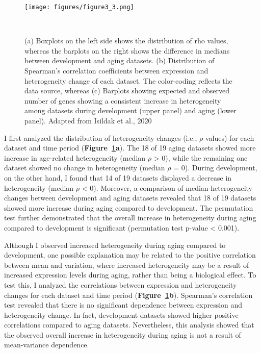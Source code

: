 \begin{figure}[h]
    \centering
    \texttt{[image: figures/figure3\_3.png]}
    \caption{(a) Boxplots on the left side shows the distribution of rho values, 
    whereas the barplots on the right shows the difference in medians between development and aging datasets.
    (b) Distribution of Spearman's correlation coefficients between expression and heterogeneity change of each dataset. 
    The color-coding reflects the data source, whereas 
    (c) Barplots showing expected and observed number of genes showing a consistent increase in heterogeneity among datasets during development (upper panel) and aging (lower panel).
    Adapted from Isildak et al., 2020
    }~\label{fig:fig3.3}
\end{figure}

I first analyzed the distribution of heterogeneity changes (i.e., $\rho$ values) for each dataset and time period (\textbf{Figure~\ref{fig:fig3.3}a}).
The 18 of 19 aging datasets showed more increase in age-related heterogeneity (median $\rho$ > 0), 
while the remaining one dataset showed no change in heterogeneity (median $\rho$ = 0). 
During development, on the other hand, I found that 14 of 19 datasets displayed a decrease in heterogeneity  (median $\rho$ < 0).
Moreover, a comparison of median heterogeneity changes between development and aging datasets revealed that 
18 of 19 datasets showed more increase during aging compared to development. 
The permutation test further demonstrated that the overall increase in heterogeneity during aging compared to development is significant (permutation test p-value < 0.001).

Although I observed increased heterogeneity during aging compared to development, 
one possible explanation may be related to the positive correlation between mean and variation, 
where increased heterogeneity may be a result of increased expression levels during aging, rather than being a biological effect.
To test this, I analyzed the correlations between expression and heterogeneity changes for each dataset and time period (\textbf{Figure~\ref{fig:fig3.3}b}).
Spearman's correlation test revealed that there is no significant dependence between expression and heterogeneity change.
In fact, development datasets showed higher positive correlations compared to aging datasets. 
Nevertheless, this analysis showed that the observed overall increase in heterogeneity during aging is not a result of mean-variance dependence.

